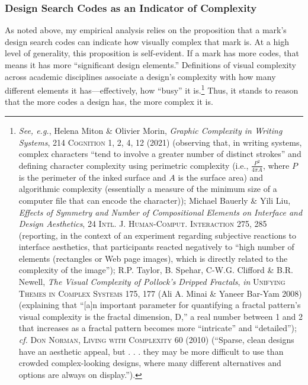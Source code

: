 \documentclass[letterpaper, 11pt, oneside]{article}
\begin{document}
\subsubsection{Design Search Codes as an Indicator of Complexity}\label{subsubsec:2A2}

As noted above, my empirical analysis relies on the proposition that a mark's design search codes can indicate how visually complex that mark is. At a high level of generality, this proposition is self-evident. If a mark has more codes, that means it has more ``significant design elements.'' Definitions of visual complexity across academic disciplines associate a design's complexity with how many different elements it has—effectively, how ``busy'' it is.\footnote{\label{supra24} \textit{See, e.g.}, Helena Miton \& Olivier Morin, \textit{Graphic Complexity in Writing Systems}, 214 \textsc{Cognition} 1, 2, 4, 12 (2021) (observing that, in writing systems, complex characters ``tend to involve a greater number of distinct strokes'' and defining character complexity using perimetric complexity (i.e., $\frac{P^2}{4{\pi}A}$, where $P$ is the perimeter of the inked surface and $A$ is the surface area) and algorithmic complexity (essentially a measure of the minimum size of a computer file that can encode the character)); Michael Bauerly \& Yili Liu, \textit{Effects of Symmetry and Number of Compositional Elements on Interface and Design Aesthetics}, 24 \textsc{Intl. J. Human-Comput. Interaction} 275, 285 (reporting, in the context of an experiment regarding subjective reactions to interface aesthetics, that participants reacted negatively to ``high number of elements (rectangles or Web page images), which is directly related to the complexity of the image''); R.P. Taylor, B. Spehar, C-W.G. Clifford \& B.R. Newell, \textit{The Visual Complexity of Pollock's Dripped Fractals}, \textit{in} \textsc{Unifying Themes in Complex Systems} 175, 177 (Ali A. Minai \& Yaneer Bar-Yam 2008) (explaining that ``[a]n important parameter for quantifying a fractal pattern's visual complexity is the fractal dimension, D,'' a real number between 1 and 2 that increases as a fractal pattern becomes more ``intricate'' and ``detailed''); \textit{cf.} \textsc{Don Norman, Living with Complexity} 60 (2010) (``Sparse, clean designs have an aesthetic appeal, but . . . they may be more difficult to use than crowded complex-looking designs, where many different alternatives and options are always on display.''). } Thus, it stands to reason that the more codes a design has, the more complex it is.
\end{document}

